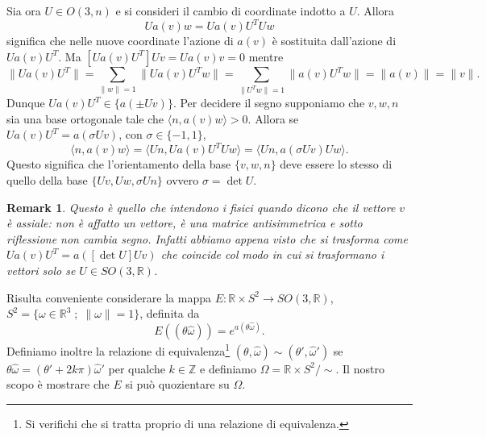 \documentclass{amsart}
\numberwithin{equation}{section}
\newtheorem{rem}[thm]{Remark}
\newcommand\bR{{\mathbb R}}
\newcommand\bZ{{\mathbb Z}}
\newcommand{\homega}{\hat\omega}
\begin{document}
Sia ora $U\in O(3,n)$ e si consideri il cambio di coordinate indotto a $U$. Allora 
\[
Ua(v)w=Ua(v)U^TUw
\] 
significa che nelle nuove coordinate l'azione di $a(v)$ \`e sostituita dall'azione di $Ua(v)U^T$. Ma $[Ua(v)U^T]Uv=Ua(v)v=0$ mentre 
\[
\|Ua(v)U^T\|=\sum_{\|w\|=1}\|Ua(v)U^Tw\|=\sum_{\|U^Tw\|=1}\|a(v)U^Tw\|=\|a(v)\|=\|v\|.
\]
Dunque $Ua(v)U^T\in\{ a(\pm Uv)\}$. Per decidere il segno supponiamo che $v,w,n$ sia una base ortogonale tale che $\langle n, a(v)w\rangle>0$. Allora se $Ua(v)U^T=a(\sigma Uv)$, con $\sigma\in\{-1,1\}$,
\[
\langle n, a(v)w\rangle=\langle U n, Ua(v)U^T Uw\rangle=\langle U n, a(\sigma Uv) Uw\rangle.
\]
Questo significa che l'orientamento della base $\{v,w,n\}$ deve essere lo stesso di quello della base $\{Uv,Uw,\sigma Un\}$ ovvero $\sigma=\det U$.
\begin{rem} Questo \`e quello che intendono i fisici quando dicono che il vettore $v$ \`e {\em assiale}: non \`e affatto un vettore, \`e una matrice antisimmetrica e sotto riflessione non cambia segno. Infatti abbiamo appena visto che si trasforma come $Ua(v)U^T =a([\det U] Uv)$ che coincide col modo in cui si trasformano i vettori solo se $U\in SO(3,\bR)$.
\end{rem}

Risulta conveniente considerare la mappa $E:\bR\times S^2\to SO(3,\bR)$, $S^2=\{\omega\in\bR^3\;;\;\|\omega\|=1\}$, definita da
\[
E((\theta\homega))=e^{a(\theta\homega)}.
\]
Definiamo inoltre la relazione di equivalenza\footnote{ Si verifichi che si tratta proprio di una relazione di equivalenza.} $(\theta,\homega)\sim(\theta',\homega')$ se $\theta\homega=(\theta'+2k\pi)\homega'$ per qualche $k\in\bZ$ e definiamo $\Omega=\bR\times S^2/\sim$. Il nostro scopo \`e mostrare che $E$ si pu\`o quozientare su $\Omega$.
\end{document}
